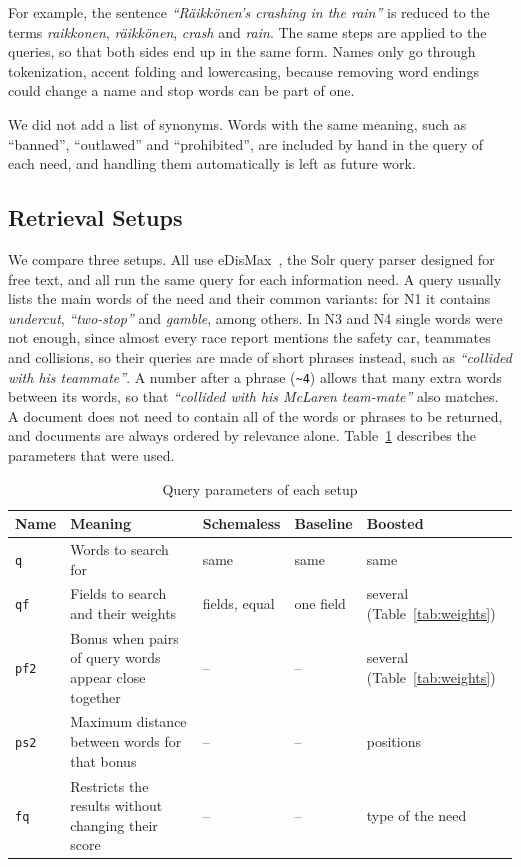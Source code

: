\documentclass[sigconf]{acmart}
\begin{document}
For example, the sentence \textit{``Räikkönen's crashing in the rain''} is
reduced to the terms \textit{raikkonen}, \textit{räikkönen}, \textit{crash}
and \textit{rain}. The same steps are applied to the queries, so that both
sides end up in the same form. Names only go through tokenization, accent
folding and lowercasing, because removing word endings could change a name
and stop words can be part of one.

We did not add a list of synonyms. Words with the same meaning, such as
``banned'', ``outlawed'' and ``prohibited'', are included by hand in the query
of each need, and handling them automatically is left as future work.

\subsection{Retrieval Setups}
\label{sec:setups}
We compare three setups. All use eDisMax~\cite{edismax}, the Solr query
parser designed for free text, and all run the same query for each information need. A query
usually lists the main words of the need and their common variants: for N1 it
contains \textit{undercut}, \textit{``two-stop''} and \textit{gamble}, among
others. In N3 and N4 single words were not enough, since almost every race
report mentions the safety car, teammates and collisions, so their queries are
made of short phrases instead, such as \textit{``collided with his
teammate''}. A number after a phrase (\texttt{\textasciitilde 4}) allows that
many extra words between its words, so that \textit{``collided with his
McLaren team-mate''} also matches. A document does not need to contain all
of the words or phrases to be returned, and documents are always ordered by
relevance alone.
Table~\ref{tab:setups} describes the parameters that were used.

\begin{table}[ht]
  \small
  \setlength{\tabcolsep}{4pt}
  \begin{tabular}{p{0.65cm}>{\raggedright\arraybackslash}p{2.35cm}>{\raggedright\arraybackslash}p{1.35cm}>{\raggedright\arraybackslash}p{1.05cm}>{\raggedright\arraybackslash}p{1.5cm}}
    \toprule
    Name & Meaning & Schemaless & Baseline & Boosted \\
    \midrule
    \texttt{q} & Words to search for & same & same & same \\
    \texttt{qf} & Fields to search and their weights & 11 fields, equal & one
    field & several (Table~\ref{tab:weights}) \\
    \texttt{pf2} & Bonus when pairs of query words appear close together & -- &
    -- & several (Table~\ref{tab:weights}) \\
    \texttt{ps2} & Maximum distance between words for that bonus & -- & -- &
    3 positions \\
    \texttt{fq} & Restricts the results without changing their score & -- & --
    & type of the need \\
    \bottomrule
  \end{tabular}
  \caption{Query parameters of each setup}
  \label{tab:setups}
\end{table}
\end{document}
